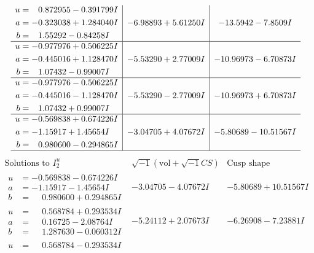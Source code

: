 \documentclass[1p]{elsarticle_modified}
\theoremstyle{definition}
\newcommand{\I}{\sqrt{-1}}
\begin{document}
$$\begin{array}{c|c|c}
\begin{aligned}
u &= \phantom{-}0.872955 - 0.391799 I \\
a &= -0.323038 + 1.284040 I \\
b &= \phantom{-}1.55292 - 0.84258 I\end{aligned}
 & -6.98893 + 5.61250 I & -13.5942 - 7.8509 I \\ \hline\begin{aligned}
u &= -0.977976 + 0.506225 I \\
a &= -0.445016 + 1.128470 I \\
b &= \phantom{-}1.07432 - 0.99007 I\end{aligned}
 & -5.53290 + 2.77009 I & -10.96973 - 6.70873 I \\ \hline\begin{aligned}
u &= -0.977976 - 0.506225 I \\
a &= -0.445016 - 1.128470 I \\
b &= \phantom{-}1.07432 + 0.99007 I\end{aligned}
 & -5.53290 - 2.77009 I & -10.96973 + 6.70873 I \\ \hline\begin{aligned}
u &= -0.569838 + 0.674226 I \\
a &= -1.15917 + 1.45654 I \\
b &= \phantom{-}0.980600 - 0.294865 I\end{aligned}
 & -3.04705 + 4.07672 I & -5.80689 - 10.51567 I\\
 \hline 
 \end{array}$$\newpage$$\begin{array}{c|c|c}  
\text{Solutions to }I^u_{2}& \I (\text{vol} + \sqrt{-1}CS) & \text{Cusp shape}\\
 \hline 
\begin{aligned}
u &= -0.569838 - 0.674226 I \\
a &= -1.15917 - 1.45654 I \\
b &= \phantom{-}0.980600 + 0.294865 I\end{aligned}
 & -3.04705 - 4.07672 I & -5.80689 + 10.51567 I \\ \hline\begin{aligned}
u &= \phantom{-}0.568784 + 0.293534 I \\
a &= \phantom{-}0.16725 - 2.08764 I \\
b &= \phantom{-}1.287630 - 0.060312 I\end{aligned}
 & -5.24112 + 2.07673 I & -6.26908 - 7.23881 I \\ \hline\begin{aligned}
u &= \phantom{-}0.568784 - 0.293534 I \\

\end{aligned}
\end{array}$$
\end{document}
